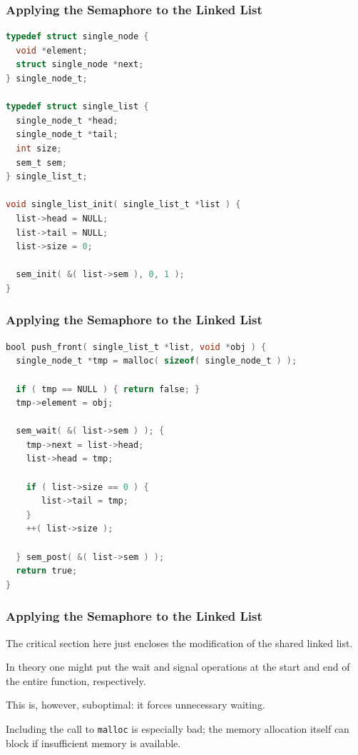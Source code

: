 \begin{frame}[fragile]
	\frametitle{Applying the Semaphore to the Linked List}

	\begin{lstlisting}[language=C]
typedef struct single_node {
  void *element;
  struct single_node *next;
} single_node_t;

typedef struct single_list {
  single_node_t *head;
  single_node_t *tail;
  int size;
  sem_t sem;
} single_list_t;

void single_list_init( single_list_t *list ) {
  list->head = NULL;
  list->tail = NULL;
  list->size = 0;

  sem_init( &( list->sem ), 0, 1 );
}
	\end{lstlisting}
\end{frame}

\begin{frame}[fragile]
	\frametitle{Applying the Semaphore to the Linked List}

	\begin{lstlisting}[language=C]
bool push_front( single_list_t *list, void *obj ) {
  single_node_t *tmp = malloc( sizeof( single_node_t ) );
  
  if ( tmp == NULL ) { return false; }  
  tmp->element = obj;

  sem_wait( &( list->sem ) ); {  
    tmp->next = list->head;
    list->head = tmp;

    if ( list->size == 0 ) {
       list->tail = tmp;
    }
    ++( list->size );
  
  } sem_post( &( list->sem ) );
  return true;
}
	\end{lstlisting}
\end{frame}

\begin{frame}
	\frametitle{Applying the Semaphore to the Linked List}

	The critical section here just encloses the modification of the shared linked list.

	In theory one might put the wait and signal operations at the start and end of the entire function, respectively.

	This is, however, suboptimal: it forces unnecessary waiting.

	Including the call to \texttt{malloc} is especially bad; the memory allocation itself can block if insufficient memory is available.

\end{frame}



